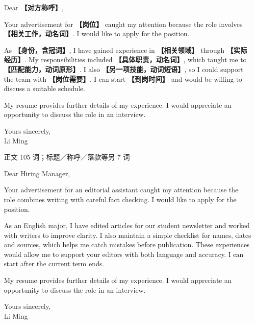 \documentclass[11pt,a4paper,fontset=macnew]{ctexart}
\newenvironment{writing}{\begingroup\fontsize{10.5}{13.5}\selectfont\setlength{\parskip}{3pt}}{\par\endgroup}
\newenvironment{example}{\begingroup\fontsize{11}{14.3}\selectfont\setlength{\parskip}{4pt}}{\par\endgroup}
\begin{document}
\begin{writing}
\noindent Dear {\bfseries 【对方称呼】},\par
Your advertisement for {\bfseries 【岗位】} caught my attention because the role involves {\bfseries 【相关工作，动名词】}. I would like to apply for the position.

As {\bfseries 【身份，含冠词】}, I have gained experience in {\bfseries 【相关领域】} through {\bfseries 【实际经历】}. My responsibilities included {\bfseries 【具体职责，动名词】}, which taught me to {\bfseries 【匹配能力，动词原形】}. I also {\bfseries 【另一项技能，动词短语】}, so I could support the team with {\bfseries 【岗位需要】}. I can start {\bfseries 【到岗时间】} and would be willing to discuss a suitable schedule.

My resume provides further details of my experience. I would appreciate an opportunity to discuss the role in an interview.

\noindent Yours sincerely,\\Li Ming\par
\end{writing}
\par\vspace{4pt}{\bfseries 完整套用示例}\par\nopagebreak
{\small 正文 105 词；标题／称呼／落款等另 7 词}\par
\begin{example}
\noindent Dear Hiring Manager,\par
Your advertisement for an editorial assistant caught my attention because the role combines writing with careful fact checking. I would like to apply for the position.

As an English major, I have edited articles for our student newsletter and worked with writers to improve clarity. I also maintain a simple checklist for names, dates and sources, which helps me catch mistakes before publication. These experiences would allow me to support your editors with both language and accuracy. I can start after the current term ends.

My resume provides further details of my experience. I would appreciate an opportunity to discuss the role in an interview.

\noindent Yours sincerely,\\Li Ming\par
\end{example}
\par\vspace{4pt}{\bfseries 好词好句：优先记这三处}\par\nopagebreak
\end{document}
